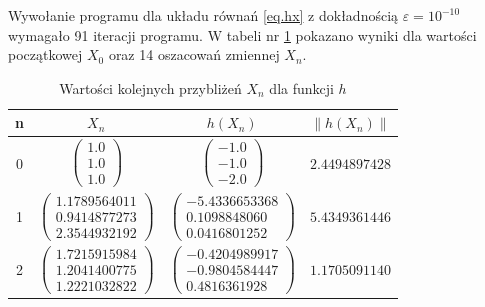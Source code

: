 \documentclass{article}
\begin{document}
    Wywołanie programu dla układu równań \eqref{eq.hx} z dokładnością $\varepsilon = 10^{-10}$
    wymagało 91 iteracji programu. W tabeli nr \ref{tab:h} pokazano wyniki dla wartości
    początkowej $X_0$ oraz 14 oszacowań zmiennej $X_n$.

    \begin{table}[htb]
      \centering
      \caption{Wartości kolejnych przybliżeń $X_n$ dla funkcji $h$}
      \label{tab:h}
      \begin{tabular}{|c|c|c|c|}
        \hline
        n      & $X_n$                                                                              & $h(X_n)$                                                                                                               & $ \lVert h(X_n)\rVert$        \\ \hline
        0      & $\begin{pmatrix} 1.0            \\ 1.0            \\ 1.0            \end{pmatrix}$ & $\begin{pmatrix} -1.0                       \\ -1.0                       \\ -2.0                       \end{pmatrix}$ & $ 2.4494897428 $              \\ \hline
        1      & $\begin{pmatrix} 1.1789564011   \\ 0.9414877273   \\ 2.3544932192   \end{pmatrix}$ & $\begin{pmatrix} -5.4336653368              \\ 0.1098848060               \\ 0.0416801252               \end{pmatrix}$ & $ 5.4349361446 $              \\ \hline
        2      & $\begin{pmatrix} 1.7215915984   \\ 1.2041400775   \\ 1.2221032822   \end{pmatrix}$ & $\begin{pmatrix} -0.4204989917              \\ -0.9804584447              \\ 0.4816361928               \end{pmatrix}$ & $ 1.1705091140 $              \\ \hline

\end{tabular}
\end{table}
\end{document}
